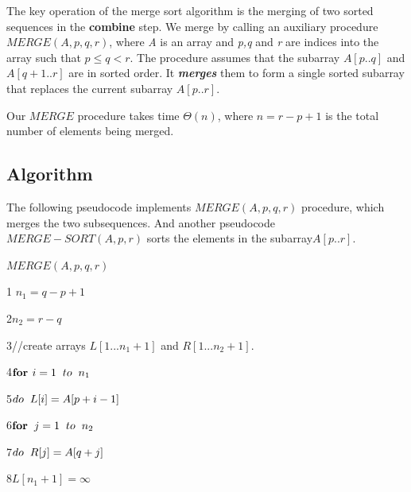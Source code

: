 \documentclass[9 pt]{report}
\begin{document}
The key operation of the merge sort algorithm is the merging of two sorted sequences in the \textbf{combine} step. We merge by calling an auxiliary procedure $MERGE(A,p,q,r)$, where \textit{A} is an array and \textit{p,q} and \textit{r} are indices into the array such that $p\leq q<r$. The procedure assumes that the subarray $A[p..q]$ and $A[q+1..r]$ are in sorted order. It \textbf{\textit{merges}} them to form a single sorted subarray that replaces the current subarray $A[p..r]$.
\vspace{0.5cm}

Our $MERGE$ procedure takes time $\Theta(n)$, where $n=r-p+1$ is the total number of elements being merged.



\subsection{\huge Algorithm}

The following pseudocode implements $MERGE(A,p,q,r)$ procedure, which merges the two subsequences. And another pseudocode $MERGE-SORT(A,p,r)$ sorts the elements in the subarray$A[p..r]$.
\vspace{1cm}

$MERGE(A,p,q,r)$


1\hspace{0.5cm} $n_1=q-p+1$


2\hspace{0.6cm}$n_2=r-q$


3\hspace{0.6cm}//create arrays $L[1...n_1+1]$ and $R[1...n_2+1]$.


4\hspace{0.6cm}$\textbf{for } i=1\hspace{0.2cm}to \hspace{0.2cm}n_1$


5\hspace{1cm}$do\hspace{0.2cm}L[i]=A[p+i-1]$

6\hspace{0.6cm}$\textbf{for}\hspace{0.2cm} j=1\hspace{0.2cm}to\hspace{0.2cm}n_2$

7\hspace{1cm}$do\hspace{0.2cm} R[j]=A[q+j]$

8\hspace{0.6cm}$L[n_1+1]=\infty$
\end{document}
